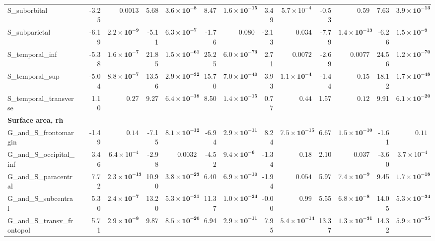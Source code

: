 {\begin{longtable}{llrrrrrrrrrrrr}
S\_suborbital &  & -3.25 & $0.0013$ & 5.68 & $\mathbf{3.6{\times}10^{-8}}$ & 8.47 & $\mathbf{1.6{\times}10^{-15}}$ & 3.49 & $5.7{\times}10^{-4}$ & -0.53 & $0.59$ & 7.63 & $\mathbf{3.9{\times}10^{-13}}$ \\
S\_subparietal &  & -6.19 & $\mathbf{2.2{\times}10^{-9}}$ & -5.11 & $\mathbf{6.3{\times}10^{-7}}$ & -1.76 & $0.080$ & -2.13 & $0.034$ & -7.79 & $\mathbf{1.4{\times}10^{-13}}$ & -6.26 & $\mathbf{1.5{\times}10^{-9}}$ \\
S\_temporal\_inf &  & -5.38 & $\mathbf{1.6{\times}10^{-7}}$ & 21.85 & $\mathbf{1.5{\times}10^{-61}}$ & 25.25 & $\mathbf{6.0{\times}10^{-73}}$ & 2.71 & $0.0072$ & -2.69 & $0.0077$ & 24.56 & $\mathbf{1.2{\times}10^{-70}}$ \\
S\_temporal\_sup &  & -5.04 & $\mathbf{8.8{\times}10^{-7}}$ & 13.56 & $\mathbf{2.9{\times}10^{-32}}$ & 15.70 & $\mathbf{7.0{\times}10^{-40}}$ & 3.93 & $\mathbf{1.1{\times}10^{-4}}$ & -1.44 & $0.15$ & 18.12 & $\mathbf{1.7{\times}10^{-48}}$ \\
S\_temporal\_transverse &  & 1.10 & $0.27$ & 9.27 & $\mathbf{6.4{\times}10^{-18}}$ & 8.50 & $\mathbf{1.4{\times}10^{-15}}$ & 0.77 & $0.44$ & 1.57 & $0.12$ & 9.91 & $\mathbf{6.1{\times}10^{-20}}$ \\
\midrule\multicolumn{14}{l}{\textbf{Surface area, rh}} \\
G\_and\_S\_frontomargin &  & -1.49 & $0.14$ & -7.15 & $\mathbf{8.1{\times}10^{-12}}$ & -6.94 & $\mathbf{2.9{\times}10^{-11}}$ & 8.24 & $\mathbf{7.5{\times}10^{-15}}$ & 6.67 & $\mathbf{1.5{\times}10^{-10}}$ & -1.61 & $0.11$ \\
G\_and\_S\_occipital\_inf &  & 3.46 & $6.4{\times}10^{-4}$ & -2.98 & $0.0032$ & -4.52 & $\mathbf{9.4{\times}10^{-6}}$ & -1.34 & $0.18$ & 2.10 & $0.037$ & -3.60 & $3.7{\times}10^{-4}$ \\
G\_and\_S\_paracentral &  & 7.72 & $\mathbf{2.3{\times}10^{-13}}$ & 10.90 & $\mathbf{3.8{\times}10^{-23}}$ & 6.40 & $\mathbf{6.9{\times}10^{-10}}$ & -1.94 & $0.054$ & 5.97 & $\mathbf{7.4{\times}10^{-9}}$ & 9.45 & $\mathbf{1.7{\times}10^{-18}}$ \\
G\_and\_S\_subcentral &  & 5.30 & $\mathbf{2.4{\times}10^{-7}}$ & 13.20 & $\mathbf{5.3{\times}10^{-31}}$ & 11.37 & $\mathbf{1.0{\times}10^{-24}}$ & -0.00 & $0.99$ & 5.55 & $\mathbf{6.8{\times}10^{-8}}$ & 14.05 & $\mathbf{5.3{\times}10^{-34}}$ \\
G\_and\_S\_transv\_frontopol &  & 5.71 & $\mathbf{2.9{\times}10^{-8}}$ & 9.87 & $\mathbf{8.5{\times}10^{-20}}$ & 6.94 & $\mathbf{2.9{\times}10^{-11}}$ & 7.95 & $\mathbf{5.4{\times}10^{-14}}$ & 13.37 & $\mathbf{1.3{\times}10^{-31}}$ & 14.32 & $\mathbf{5.9{\times}10^{-35}}$ \\

\end{longtable}}
